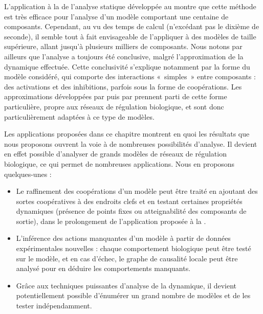 L'application à la  de l'analyse statique développée au 
montre que cette méthode est très efficace pour l'analyse d'un modèle
comportant une centaine de composants.
Cependant, au vu des temps de calcul (n'excédant pas le dixième de seconde),
il semble tout à fait envisageable de l'appliquer à des modèles de taille supérieure,
allant jusqu'à plusieurs milliers de composants.
Nous notons par ailleurs que l'analyse a toujours été conclusive, malgré l'approximation de la
dynamique effectuée.
Cette conclusivité s'explique notamment par la forme du modèle considéré,
qui comporte des interactions «~simples~» entre composants :
des activations et des inhibitions, parfois sous la forme de coopérations.
Les approximations développées par  puis par 
prennent parti de cette forme particulière, propre aux réseaux de régulation biologique,
et sont donc particulièrement adaptées à ce type de modèles.

\myskip

Les applications proposées dans ce chapitre montrent en quoi les résultats que nous proposons
ouvrent la voie à de nombreuses possibilités d'analyse.
Il devient en effet possible d'analyser de grands modèles de réseaux de régulation biologique,
ce qui permet de nombreuses applications.
Nous en proposons quelques-unes :
\begin{itemize}
  \item Le raffinement des coopérations d'un modèle peut être traité
    en ajoutant des sortes coopératives à des endroits clefs
    et en testant certaines propriétés dynamiques (présence de points fixes ou
    atteignabilité des composants de sortie),
    dans le prolongement de l'application proposée à la .
  \item L'inférence des actions manquantes d'un modèle à partir de données expérimentales
    nouvelles : chaque comportement biologique peut être testé sur le modèle,
    et en cas d'échec, le graphe de causalité locale peut être analysé pour en déduire
    les comportements manquants.
  \item Grâce aux techniques puissantes d'analyse de la dynamique, il devient potentiellement
    possible d'énumérer un grand nombre de modèles et de les tester indépendamment.
\end{itemize}

